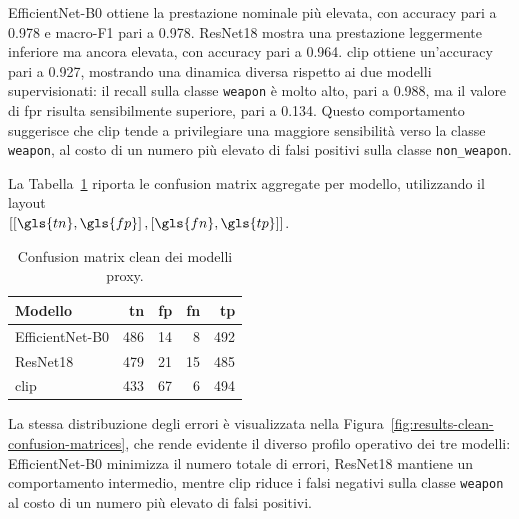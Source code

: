 EfficientNet-B0 ottiene la prestazione nominale più elevata, con accuracy pari a
0.978 e macro-F1 pari a 0.978. ResNet18 mostra una prestazione leggermente
inferiore ma ancora elevata, con accuracy pari a 0.964. \gls{clip} ottiene
un'accuracy pari a 0.927, mostrando una dinamica diversa rispetto ai due modelli
supervisionati: il recall sulla classe \texttt{weapon} è molto alto, pari a
0.988, ma il valore di \gls{fpr} risulta sensibilmente superiore, pari a 0.134.
Questo comportamento suggerisce che \gls{clip} tende a privilegiare una maggiore
sensibilità verso la classe \texttt{weapon}, al costo di un numero più elevato di
falsi positivi sulla classe \texttt{non\_weapon}.

La Tabella~\ref{tab:results-clean-confusion-matrices} riporta le confusion
matrix aggregate per modello, utilizzando il layout\\
\(\left[\left[\gls{tn}, \gls{fp}\right], \left[\gls{fn}, \gls{tp}\right]\right]\).

\begin{table}[H]
\centering
\caption{Confusion matrix clean dei modelli proxy.}
\label{tab:results-clean-confusion-matrices}
\begin{tabular}{@{}l r r r r@{}}
\toprule
\textbf{Modello} & \textbf{\gls{tn}} & \textbf{\gls{fp}} & \textbf{\gls{fn}} & \textbf{\gls{tp}} \\
\midrule
EfficientNet-B0 & 486 & 14 & 8  & 492 \\
ResNet18        & 479 & 21 & 15 & 485 \\
\gls{clip}      & 433 & 67 & 6  & 494 \\
\bottomrule
\end{tabular}
\end{table}

La stessa distribuzione degli errori è visualizzata nella
Figura~\ref{fig:results-clean-confusion-matrices}, che rende evidente il diverso
profilo operativo dei tre modelli: EfficientNet-B0 minimizza il numero totale di
errori, ResNet18 mantiene un comportamento intermedio, mentre \gls{clip} riduce
i falsi negativi sulla classe \texttt{weapon} al costo di un numero più elevato
di falsi positivi.

